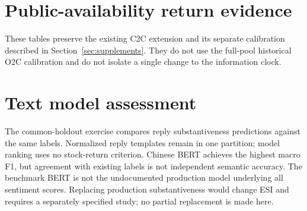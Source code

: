 \section{Public-availability return evidence}
These tables preserve the existing C2C extension and its separate calibration described in Section~\ref{sec:supplements}. They do not use the full-pool historical O2C calibration and do not isolate a single change to the information clock.

\clearpage


\section{Text model assessment}\label{app:nlp_methodology}
The common-holdout exercise compares reply substantiveness predictions against the same labels. Normalized reply templates remain in one partition; model ranking uses no stock-return criterion. Chinese BERT achieves the highest macro F1, but agreement with existing labels is not independent semantic accuracy. The benchmark BERT is not the undocumented production model underlying all sentiment scores. Replacing production substantiveness would change ESI and requires a separately specified study; no partial replacement is made here.


